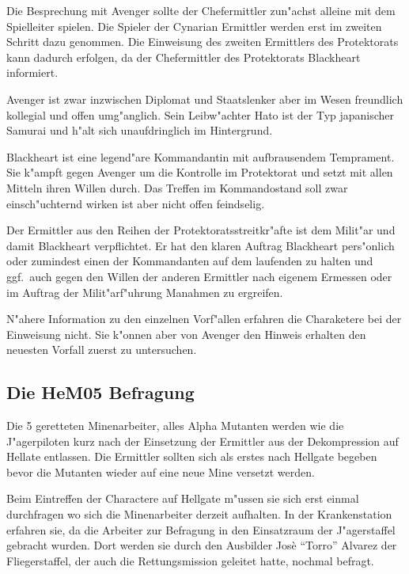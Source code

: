 \begin{remarks}
Die Besprechung mit Avenger sollte der Chefermittler zun"achst alleine mit dem Spielleiter spielen. Die Spieler der Cynarian Ermittler werden erst im zweiten Schritt dazu genommen. Die Einweisung des zweiten Ermittlers des Protektorats kann dadurch erfolgen, da\3 der Chefermittler des Protektorats Blackheart informiert.

Avenger ist zwar inzwischen Diplomat und Staatslenker aber im Wesen freundlich kollegial und offen umg"anglich. Sein Leibw"achter Hato ist der Typ japanischer Samurai und h"alt sich unaufdringlich im Hintergrund.

Blackheart ist eine legend"are Kommandantin mit aufbrausendem Temprament. Sie k"ampft gegen Avenger um die Kontrolle im Protektorat und setzt mit allen Mitteln ihren Willen durch. Das Treffen im Kommandostand soll zwar einsch"uchternd wirken ist aber nicht offen feindselig.

Der Ermittler aus den Reihen der Protektoratsstreitkr"afte ist dem Milit"ar und damit Blackheart verpflichtet. Er hat den klaren Auftrag Blackheart pers"onlich oder zumindest einen der Kommandanten auf dem laufenden zu halten und ggf.~auch gegen den Willen der anderen Ermittler nach eigenem Ermessen oder im Auftrag der Milit"arf"uhrung Ma\3nahmen zu ergreifen.

N"ahere Information zu den einzelnen Vorf"allen erfahren die Charaketere bei der Einweisung nicht. Sie k"onnen aber von Avenger den Hinweis erhalten den neuesten Vorfall zuerst zu untersuchen.
\end{remarks}

\subsection{Die HeM05 Befragung}

Die 5 geretteten Minenarbeiter, alles Alpha Mutanten werden wie die J"agerpiloten kurz nach der Einsetzung der Ermittler aus der Dekompression auf Hellate entlassen. Die Ermittler sollten sich als erstes nach Hellgate begeben bevor die Mutanten wieder auf eine neue Mine versetzt werden.

Beim Eintreffen der Charactere auf Hellgate m"ussen sie sich erst einmal durchfragen wo sich die Minenarbeiter derzeit aufhalten. In der Krankenstation erfahren sie, da\3 die Arbeiter zur Befragung in den Einsatzraum der J"agerstaffel gebracht wurden. Dort werden sie durch den Ausbilder Jos\`{e} ``Torro'' Alvarez der Fliegerstaffel, der auch die Rettungsmission geleitet hatte, nochmal befragt.

